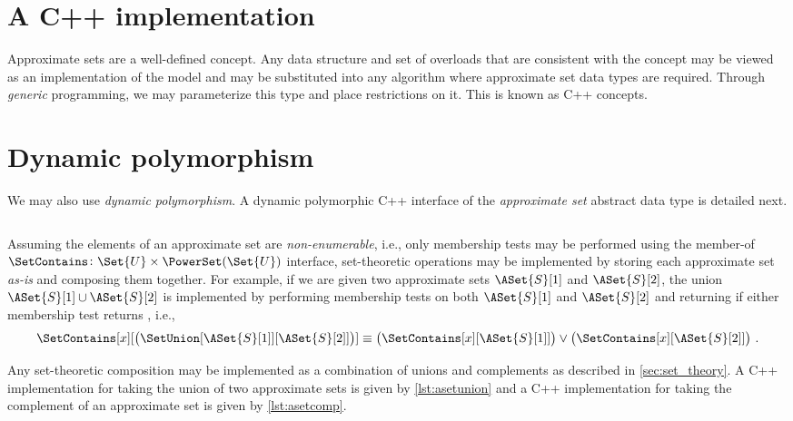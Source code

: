 \documentclass[ ../main.tex]{subfiles}
\begin{document}
\section{A C++ implementation}
\label{sec:impl}
Approximate sets are a well-defined concept. Any data structure and set of 
overloads that are consistent with the concept may be viewed as an 
implementation of the model and may be substituted into any algorithm where 
approximate set data types are required. Through \emph{generic} programming, we 
may parameterize this type and place restrictions on it. This is known as C++ 
concepts.

\section{Dynamic polymorphism}
We may also use \emph{dynamic polymorphism}. A dynamic polymorphic C++ 
interface of the \emph{approximate set} abstract data type is detailed next.

\inputminted[breaklines,frame=lines,linenos]{c++}{code/random_approximate_sets_adt/include/approximate_set/dynamic/aset.hpp}

Assuming the elements of an approximate set are \emph{non-enumerable}, i.e., only membership tests may be performed using the member-of $\SetContains \colon \Set{U} \times \PowerSet(\Set{U})$ interface, set-theoretic operations may be implemented by storing each approximate set \emph{as-is} and composing them together. For example, if we are given two approximate sets $\ASet{S}[1]$ and $\ASet{S}[2]$, the union $\ASet{S}[1] \cup \ASet{S}[2]$ is implemented by performing membership tests on both $\ASet{S}[1]$ and $\ASet{S}[2]$ and returning \True if either membership test returns \True, i.e.,
\begin{equation}
    \SetContains[x][\left(\SetUnion[\ASet{S}[1]][\ASet{S}[2]]\right)] \equiv \left(\SetContains[x][\ASet{S}[1]]\right) \lor \left(\SetContains[x][\ASet{S}[2]]\right)\,.
\end{equation}

Any set-theoretic composition may be implemented as a combination of unions and complements as described in \cref{sec:set_theory}. A C++ implementation for taking the union of two approximate sets is given by \cref{lst:asetunion} and a C++ implementation for taking the complement of an approximate set is given by \cref{lst:asetcomp}.
\end{document}
